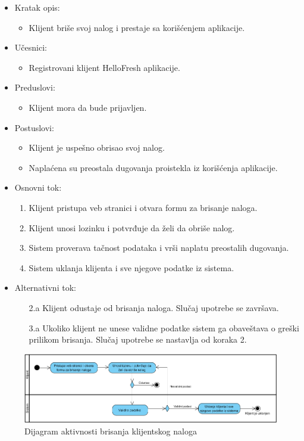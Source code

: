 
\begin{itemize}
    \item Kratak opis:
        \begin{itemize}
            \item Klijent briše svoj nalog i prestaje sa korišćenjem aplikacije.
        \end{itemize}
    \item Učesnici:
        \begin{itemize}
            \item Registrovani klijent HelloFresh aplikacije.
        \end{itemize}
    \item Preduslovi:
        \begin{itemize}
            \item Klijent mora da bude prijavljen.
        \end{itemize}
    \item Postuslovi:
        \begin{itemize}
            \item Klijent je uspešno obrisao svoj nalog.
            \item Naplaćena su preostala dugovanja proistekla iz korišćenja aplikacije.
        \end{itemize}
    \item Osnovni tok:
        \begin{enumerate}
            \item Klijent pristupa veb stranici i otvara formu za brisanje naloga.
            \item Klijent unosi lozinku i potvrđuje da želi da obriše nalog.
            \item Sistem proverava tačnost podataka i vrši naplatu preostalih dugovanja.
            \item Sistem uklanja klijenta i sve njegove podatke iz sistema.
        \end{enumerate}
    \item Alternativni tok:
        \begin{itemize}
            \item[2.a] Klijent odustaje od brisanja naloga. Slučaj upotrebe se završava.
			\item[3.a] Ukoliko klijent ne unese validne podatke sistem ga obaveštava o greški prilikom brisanja. Slučaj upotrebe se nastavlja od koraka 2.
        \end{itemize}
\end{itemize}

\begin{figure}[H]
\begin{center}
\includegraphics[width=\textwidth]{Pictures/activity_client_delete.png}
\end{center}
    \caption{Dijagram aktivnosti brisanja klijentskog naloga}
\label{fig:ActivityClientDelete}
\end{figure}